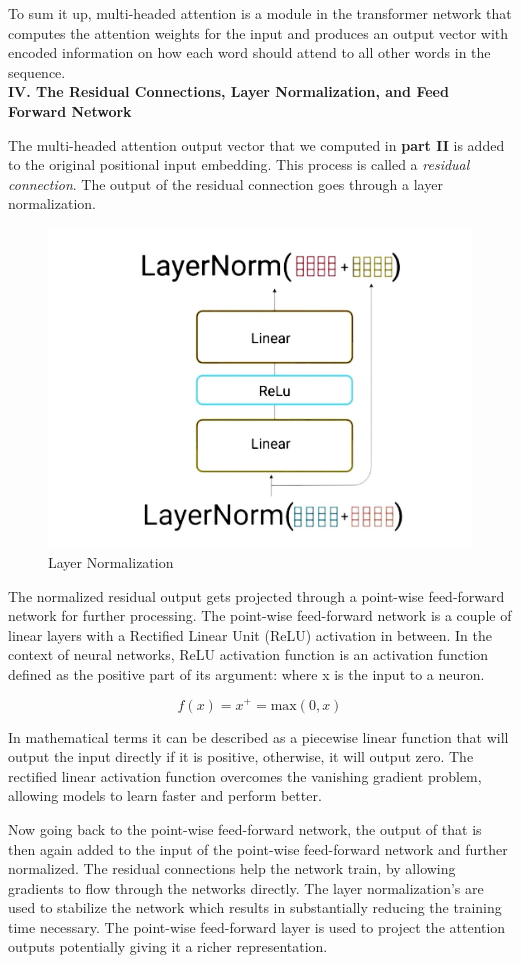 To sum it up, multi-headed attention is a module in the transformer network that computes the attention weights for the input and produces an output vector with encoded information on how each word should attend to all other words in the sequence. \\

\noindent
\textbf{IV. The Residual Connections, Layer Normalization, and Feed Forward Network}

The multi-headed attention output vector that we computed in \textbf{part II} is added to the original positional input embedding. This process is called a \emph{residual connection}. The output of the residual connection goes through a layer normalization. 

\begin{figure}[H]
\centering
\includegraphics[width=.4\textwidth]{figures/t10.jpg}
\caption{Layer Normalization}
\end{figure}

The normalized residual output gets projected through a point-wise feed-forward network for further processing. The point-wise feed-forward network is a couple of linear layers with a Rectified Linear Unit (ReLU) activation in between. In the context of neural networks, ReLU activation function\cite{eleven} is an activation function defined as the positive part of its argument: where x is the input to a neuron.

\begin{equation}
\label{softmax}
f(x) = x^{+} = \text{max}(0,x)
\end{equation}

\noindent
In mathematical terms it can be described as a piecewise linear function that will output the input directly if it is positive, otherwise, it will output zero. The rectified linear activation function overcomes the vanishing gradient problem, allowing models to learn faster and perform better.

Now going back to the point-wise feed-forward network, the output of that is then again added to the input of the point-wise feed-forward network and further normalized. The residual connections help the network train, by allowing gradients to flow through the networks directly. The layer normalization's are used to stabilize the network which results in substantially reducing the training time necessary. The point-wise feed-forward layer is used to project the attention outputs potentially giving it a richer representation. \\

